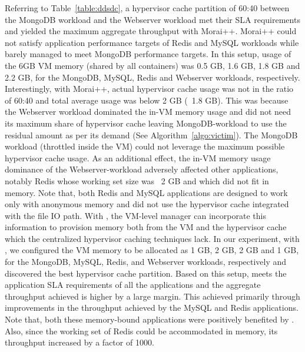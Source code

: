 Referring to Table~\ref{table:ddsdc}, a hypervisor cache partition of 60:40 
between the MongoDB workload and the Webserver workload met their SLA requirements
and yielded the maximum aggregate throughput with Morai++.
%
Morai++ could not satisfy application performance targets of Redis and MySQL 
workloads while barely managed to meet MongoDB performance targets. 
%
In this setup, usage of the 6GB VM memory (shared
by all containers) was 0.5 GB, 1.6 GB, 1.8 GB and 2.2 GB, for the 
MongoDB, MySQL,
Redis and Webserver workloads, respectively.
%
%
Interestingly, with Morai++, actual hypervisor cache usage was not in the ratio of 60:40
and total average usage was below 2 GB (~1.8 GB).
%
%
%
%
%
This was because the Webserver workload dominated the in-VM memory usage 
and did not need its maximum share of hypervisor cache leaving MongoDB-workload
to use the residual amount as per its demand (See Algorithm~\ref{algo:victim}).
%
The MongoDB workload (throttled inside the VM) could not leverage the
maximum possible hypervisor cache usage. 
%
As an additional effect, the in-VM memory usage dominance of the Webserver-workload
adversely affected other applications, notably Redis whose
working set size was ~2 GB and which did not fit in memory.
%
Note that, both Redis and MySQL applications are designed
to work only with anonymous memory and did not use the hypervisor cache
integrated with the file IO path.
%
%
%
With \dd{}, the VM-level manager can incorporate this information to
provision memory both from the VM and the hypervisor cache which
%
the centralized hypervisor caching techniques lack. 
%
In our experiment, with \dd{}, we configured the VM memory to be allocated
as 1 GB, 2 GB, 2 GB and 1 GB, for the MongoDB, MySQL, Redis, and Webserver
workloads, respectively and discovered the best hypervisor cache
partition.
%
Based on this setup, \dd{} meets the application SLA requirements
of all the applications and the aggregate throughput achieved is higher
by a large margin.
%
This achieved primarily through improvements in the throughput achieved
by the MySQL and Redis applications.
%
Note that, both these memory-bound applications were positively 
benefited by \dd{}.
%
Also, since the working set of Redis could be accommodated in memory,
its throughput increased by a factor of 1000.


